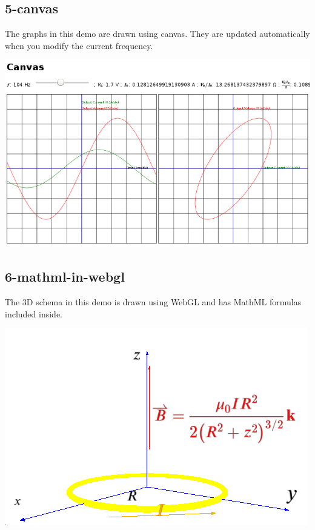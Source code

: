 \subsection{5-canvas}

The graphs in this demo are drawn using canvas. They are updated automatically
when you modify the current frequency.

\href{http://fred-wang.github.io/MathUI2014/demos/5-canvas.html}{\includegraphics{screenshots/5-canvas}}

\subsection{6-mathml-in-webgl}

The 3D schema in this demo is drawn using WebGL and has MathML formulas
included inside.

\href{http://fred-wang.github.io/MathUI2014/demos/6-mathml-in-webgl}{\includegraphics{screenshots/6-mathml-in-webgl-1}}

